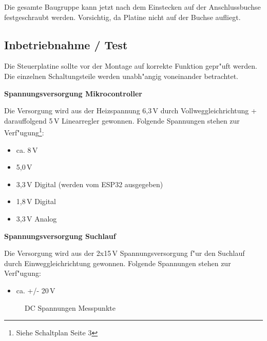 \documentclass[ngerman,11pt,parskip=half] {scrartcl}
\begin{document}
Die gesamte Baugruppe kann jetzt nach dem Einstecken auf der Anschlussbuchse festgeschraubt werden. Vorsichtig, da Platine nicht auf der Buchse aufliegt.

\subsection{Inbetriebnahme / Test} \label{sec:aufbau:inbetriebnahme}

Die Steuerplatine sollte vor der Montage auf korrekte Funktion gepr"uft werden. Die einzelnen Schaltungsteile werden unabh"angig voneinander betrachtet.

\textbf{Spannungsversorgung Mikrocontroller}

Die Versorgung wird aus der Heizspannung 6,3\,V durch Vollweggleichrichtung + darauffolgend 5\,V Linearregler gewonnen. Folgende Spannungen stehen zur Verf"ugung\footnote{Siehe Schaltplan Seite 3}:
\begin{itemize}
\item ca. 8\,V
\item 5,0\,V
\item 3,3\,V Digital (werden vom ESP32 ausgegeben)
\item 1,8\,V Digital
\item 3,3\,V Analog
\end{itemize}

\textbf{Spannungsversorgung Suchlauf}

Die Versorgung wird aus der 2x15\,V Spannungsversorgung f"ur den Suchlauf durch Einweggleichrichtung gewonnen. Folgende Spannungen stehen zur Verf"ugung:
\begin{itemize}
\item ca. +/- 20\,V
\end{itemize}

\begin{figure}[H]
\centering
{}
\caption{DC Spannungen Messpunkte} \label{fig:1}
\end{figure}
\end{document}
